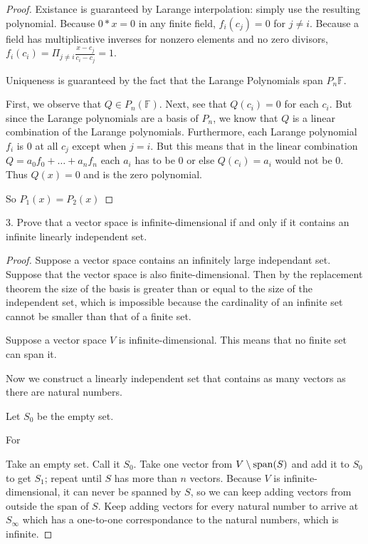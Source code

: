 \documentclass[12pt]{article} %
\newcommand{\F}{\mathbb{F}}
\newcommand{\s}{{\rm span}}
\begin{document}
\begin{flushleft}
\begin{proof}
  Existance is guaranteed by Larange interpolation: simply use the resulting polynomial. Because $0*x=0$ in any finite field, $f_i(c_j)=0$ for $j\neq i$. Because a field has multiplicative inverses for nonzero elements and no zero divisors, $f_i(c_i)= \Pi_{j\neq i} \frac{x-c_j}{c_i - c_j} = 1$.

  Uniqueness is guaranteed by the fact that the Larange Polynomials span $P_n{\F}$.

  First, we observe that $Q\in P_n(\F)$. Next, see that $Q(c_i)=0$ for each $c_i$. But since the Larange polynomials are a basis of $P_n$, we know that $Q$ is a linear combination of the Larange polynomials. Furthermore, each Larange polynomial $f_i$ is $0$ at all $c_j$ except when $j=i$. But this means that in the linear combination $Q = a_0f_0 + \ldots + a_nf_n$ each $a_i$ has to be 0 or else $Q(c_i)=a_i$ would not be $0$. Thus $Q(x) = 0$ and is the zero polynomial.

  So $P_1(x)=P_2(x)$
\end{proof}

\vspace{.5cm}


3.  Prove that a vector space is infinite-dimensional if and only if it contains an infinite linearly independent set.

\begin{proof}
  Suppose a vector space contains an infinitely large independant set. Suppose that the vector space is also finite-dimensional. Then by the replacement theorem the size of the basis is greater than or equal to the size of the independent set, which is impossible because the cardinality of an infinite set cannot be smaller than that of a finite set.

  Suppose a vector space $V$ is infinite-dimensional. This means that no finite set can span it.

  Now we construct a linearly independent set that contains as many vectors as there are natural numbers.

  Let $S_0$ be the empty set.

  For 

  Take an empty set. Call it $S_0$. Take one vector from $V\setminus \s(S)$ and add it to $S_0$ to get $S_1$; repeat until $S$ has more than $n$ vectors. Because $V$ is infinite-dimensional, it can never be spanned by $S$, so we can keep adding vectors from outside the span of $S$. Keep adding vectors for every natural number to arrive at $S_\infty$ which has a one-to-one correspondance to the natural numbers, which is infinite.
\end{proof}


\end{flushleft}
\end{document}

